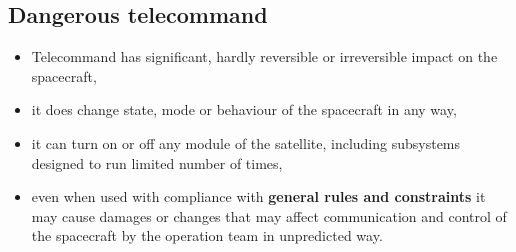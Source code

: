 \subsection{Dangerous telecommand}
\vspace{1em}
\begin{itemize}
    \item Telecommand has significant, hardly reversible or irreversible impact on the spacecraft,
    \item it does change state, mode or behaviour of the spacecraft in any way,
    \item it can turn on or off any module of the satellite, including subsystems designed to run limited number of times,
    \item even when used with compliance with \textbf{general rules and constraints} it may cause damages or changes that may affect communication and control of the spacecraft by the operation team in unpredicted way.
\end{itemize}
